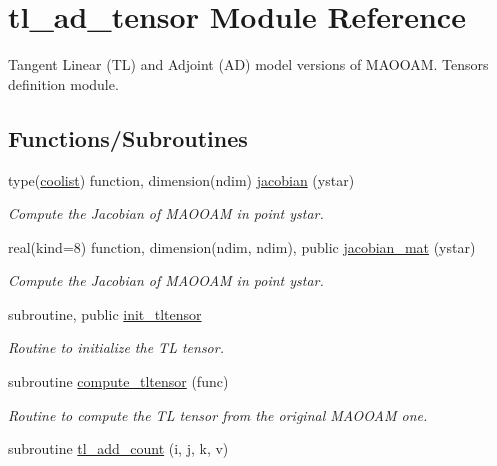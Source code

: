 \hypertarget{namespacetl__ad__tensor}{}\section{tl\+\_\+ad\+\_\+tensor Module Reference}
\label{namespacetl__ad__tensor}


Tangent Linear (TL) and Adjoint (AD) model versions of M\+A\+O\+O\+AM. Tensors definition module.  


\subsection*{Functions/\+Subroutines}
\begin{DoxyCompactItemize}
\item 
type(\hyperlink{structtensor_1_1coolist}{coolist}) function, dimension(ndim) \hyperlink{namespacetl__ad__tensor_af4dbec99377125d7df10d89524ba91b2}{jacobian} (ystar)
\begin{DoxyCompactList}\small\item\em Compute the Jacobian of M\+A\+O\+O\+AM in point ystar. \end{DoxyCompactList}\item 
real(kind=8) function, dimension(ndim, ndim), public \hyperlink{namespacetl__ad__tensor_a2782a5116e8bb677b2d5e9637b509cf3}{jacobian\+\_\+mat} (ystar)
\begin{DoxyCompactList}\small\item\em Compute the Jacobian of M\+A\+O\+O\+AM in point ystar. \end{DoxyCompactList}\item 
subroutine, public \hyperlink{namespacetl__ad__tensor_a8a94fe84e907fc8835f798eddcff38e8}{init\+\_\+tltensor}
\begin{DoxyCompactList}\small\item\em Routine to initialize the TL tensor. \end{DoxyCompactList}\item 
subroutine \hyperlink{namespacetl__ad__tensor_a8b1027b49025fbeacd8fbd5d2127bebc}{compute\+\_\+tltensor} (func)
\begin{DoxyCompactList}\small\item\em Routine to compute the TL tensor from the original M\+A\+O\+O\+AM one. \end{DoxyCompactList}\item 
subroutine \hyperlink{namespacetl__ad__tensor_a3d69845cace6faef04342c297b0c2a09}{tl\+\_\+add\+\_\+count} (i, j, k, v)

\end{DoxyCompactItemize}
